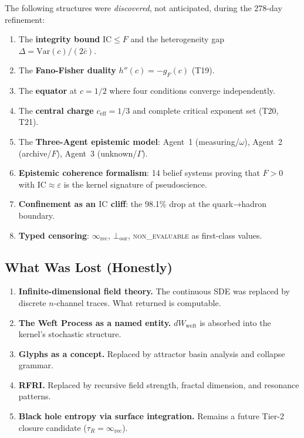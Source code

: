 \documentclass[
  aps,
  prd,
  preprint,
  superscriptaddress,
  nofootinbib,
  floatfix,
  longbibliography
]{revtex4-2}
\newcommand{\tR}{\tau_{\!R}}
\newcommand{\Gam}{\Gamma}
\newcommand{\eps}{\varepsilon}
\newcommand{\regime}[1]{\textnormal{\textsc{#1}}}
\newcommand{\IC}{\mathrm{IC}}
\newcommand{\Fid}{F}
\newcommand{\Drft}{\omega}
\newcommand{\ceff}{c_{\mathrm{eff}}}
\newcommand{\gFisher}{g_{\!F}}
\newcommand{\hetgap}{\Delta}
\begin{document}
The following structures were \emph{discovered}, not anticipated,
during the 278-day refinement:
\begin{enumerate}[nosep,leftmargin=*]
  \item The \textbf{integrity bound} $\IC \leq \Fid$ and the
    heterogeneity gap $\hetgap = \mathrm{Var}(c)/(2\bar{c})$.
  \item The \textbf{Fano-Fisher duality} $h''(c) = -\gFisher(c)$
    (T19).
  \item The \textbf{equator} at $c = 1/2$ where four conditions
    converge independently.
  \item The \textbf{central charge} $\ceff = 1/3$ and complete
    critical exponent set (T20, T21).
  \item The \textbf{Three-Agent epistemic model}:
    Agent~1 (measuring/$\Drft$), Agent~2 (archive/$\Fid$),
    Agent~3 (unknown/$\Gam$).
  \item \textbf{Epistemic coherence formalism}: 14 belief systems
    proving that $\Fid > 0$ with $\IC \approx \eps$ is the
    kernel signature of pseudoscience.
  \item \textbf{Confinement as an $\IC$ cliff}: the 98.1\% drop
    at the quark→hadron boundary.
  \item \textbf{Typed censoring}: $\infty_{\mathrm{rec}}$,
    $\bot_{\mathrm{oor}}$, \regime{non\_evaluable}
    as first-class values.
\end{enumerate}

\subsection{What Was Lost (Honestly)}

\begin{enumerate}[nosep,leftmargin=*]
  \item \textbf{Infinite-dimensional field theory.}
    The continuous SDE was replaced by discrete $n$-channel
    traces. What returned is computable.
  \item \textbf{The Weft Process as a named entity.}
    $dW_{\mathrm{weft}}$ is absorbed into the kernel's
    stochastic structure.
  \item \textbf{Glyphs as a concept.} Replaced by attractor
    basin analysis and collapse grammar.
  \item \textbf{RFRI.} Replaced by recursive field strength,
    fractal dimension, and resonance patterns.
  \item \textbf{Black hole entropy via surface integration.}
    Remains a future Tier-2 closure candidate
    ($\tR = \infty_{\mathrm{rec}}$).
\end{enumerate}
\end{document}
